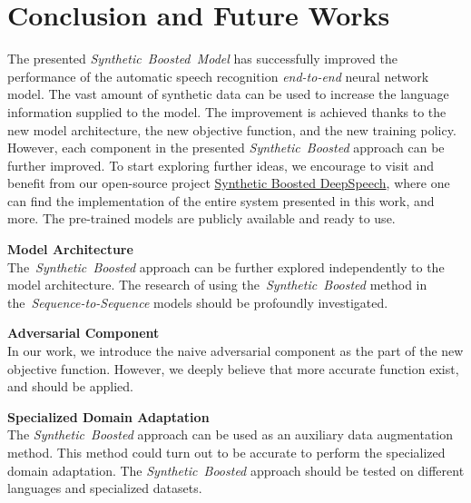 
\chapter{Conclusion and Future Works}\label{ch:conclusion-and-future-works}

The presented \textit{Synthetic~Boosted~Model} has successfully improved
the performance of the automatic speech recognition \textit{end-to-end} neural network model.
The vast amount of synthetic data can be used to increase the language information supplied to the model.
The improvement is achieved thanks to the new model architecture, the new objective function,
and the new training policy.
However, each component in the presented \textit{Synthetic~Boosted} approach can be further improved.
To start exploring further ideas, we encourage to visit and benefit from our open-source project
\href{https://github.com/rolczynski/Synthetic-Boosted-DeepSpeech}{Synthetic Boosted DeepSpeech}, where
one can find the implementation of the entire system presented in this work, and more.
The pre-trained models are publicly available and ready to use.

\vspace{0.5cm}
\noindent\textbf{Model Architecture} \\
The~\textit{Synthetic~Boosted} approach can be further explored independently to the model architecture.
The research of using the~\textit{Synthetic~Boosted} method in the~\textit{Sequence-to-Sequence} models
should be profoundly investigated.

\vspace{0.5cm}
\noindent\textbf{Adversarial Component} \\
In our work, we introduce the naive adversarial component as the part of the new objective function.
However, we deeply believe that more accurate function exist, and should be applied.

\vspace{0.5cm}
\noindent\textbf{Specialized Domain Adaptation} \\
The \textit{Synthetic~Boosted} approach can be used as an auxiliary data augmentation method.
This method could turn out to be accurate to perform the specialized domain adaptation.
The \textit{Synthetic~Boosted} approach should be tested on different languages and specialized datasets.
